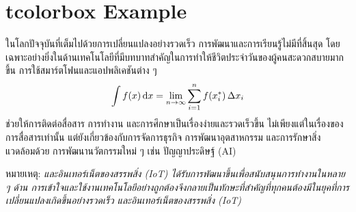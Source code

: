 \documentclass[11pt, oneside]{book}
\begin{document}
\section{tcolorbox Example}

\begin{tcolorbox}[title=\bfseries ทฤษฎีบทไก่จิกเด็กตายบนปากโอ่ง]
    ในโลกปัจจุบันที่เต็มไปด้วยการเปลี่ยนแปลงอย่างรวดเร็ว การพัฒนาและการเรียนรู้ไม่มีที่สิ้นสุด โดยเฉพาะอย่างยิ่งในด้านเทคโนโลยีที่มีบทบาทสำคัญในการทำให้ชีวิตประจำวันของผู้คนสะดวกสบายมากขึ้น การใช้สมาร์ตโฟนและแอปพลิเคชันต่าง ๆ
    \begin{equation}
        \int f(x) \odif{x} = \lim_{n\to\infty}\sum_{i=1}^n f(x_i^*)\,\Delta x_i
    \end{equation}
    ช่วยให้การติดต่อสื่อสาร การทำงาน และการศึกษาเป็นเรื่องง่ายและรวดเร็วขึ้น ไม่เพียงแต่ในเรื่องของการสื่อสารเท่านั้น แต่ยังเกี่ยวข้องกับการจัดการธุรกิจ การพัฒนาอุตสาหกรรม และการรักษาสิ่งแวดล้อมด้วย การพัฒนานวัตกรรมใหม่ ๆ เช่น ปัญญาประดิษฐ์ (AI)
\end{tcolorbox}
หมายเหตุ: \emph{และอินเทอร์เน็ตของสรรพสิ่ง (IoT) ได้รับการพัฒนาขึ้นเพื่อสนับสนุนการทำงานในหลาย ๆ ด้าน การเข้าใจและใช้งานเทคโนโลยีอย่างถูกต้องจึงกลายเป็นทักษะที่สำคัญที่ทุกคนต้องมีในยุคที่การเปลี่ยนแปลงเกิดขึ้นอย่างรวดเร็ว และอินเทอร์เน็ตของสรรพสิ่ง (IoT)}
\end{document}
